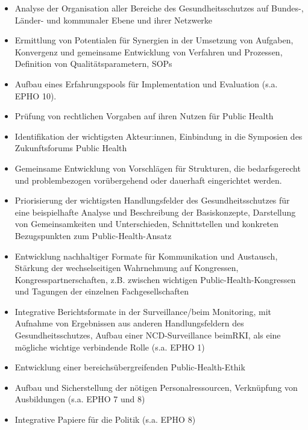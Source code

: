 \documentclass{article}
\begin{document}
\begin{itemize}
\item Analyse der Organisation aller Bereiche des Gesundheitsschutzes auf Bundes-, Länder- und kommunaler Ebene und ihrer Netzwerke 


\item Ermittlung von Potentialen für Synergien in der Umsetzung von Aufgaben, Konvergenz und gemeinsame Entwicklung von Verfahren und Prozessen, Definition von Qualitätsparametern, SOPs


\item Aufbau eines Erfahrungspools für Implementation und Evaluation (s.a. EPHO 10).


\item Prüfung von rechtlichen Vorgaben auf ihren Nutzen für Public Health


\item Identifikation der wichtigsten Akteur:innen, Einbindung in die Symposien des Zukunftsforums Public Health


\item Gemeinsame Entwicklung von Vorschlägen für Strukturen, die bedarfsgerecht und problembezogen vorübergehend oder dauerhaft eingerichtet werden.


\item Priorisierung der wichtigsten Handlungsfelder des Gesundheitsschutzes für eine beispielhafte Analyse und Beschreibung der Basiskonzepte, Darstellung von Gemeinsamkeiten und Unterschieden, Schnittstellen und konkreten Bezugspunkten zum Public-Health-Ansatz


\item Entwicklung nachhaltiger Formate für Kommunikation und Austausch, Stärkung der wechselseitigen Wahrnehmung auf Kongressen, Kongresspartnerschaften, z.B. zwischen wichtigen Public-Health-Kongressen und Tagungen der einzelnen Fachgesellschaften


\item Integrative Berichtsformate in der Surveillance/beim Monitoring, mit Aufnahme von Ergebnissen aus anderen Handlungsfeldern des Gesundheitsschutzes, Aufbau einer NCD-Surveillance beimRKI, als eine mögliche wichtige verbindende Rolle (s.a. EPHO 1)


\item Entwicklung einer bereichsübergreifenden Public-Health-Ethik


\item Aufbau und Sicherstellung der nötigen Personalressourcen, Verknüpfung von Ausbildungen (s.a. EPHO 7 und 8)


\item Integrative Papiere für die Politik (s.a. EPHO 8)


\end{itemize}
\end{document}
